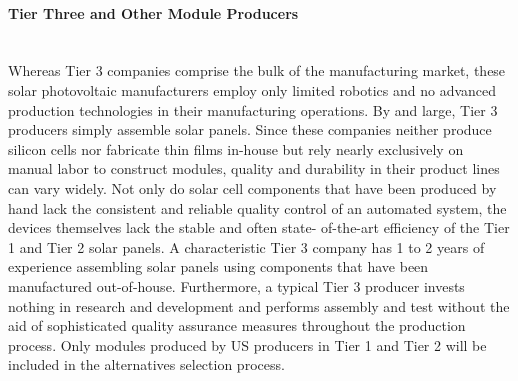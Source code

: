 \paragraph{Tier Three and Other Module Producers}\mbox{ }\\
Whereas Tier 3 companies comprise the bulk of the manufacturing market, these solar photovoltaic manufacturers employ only limited robotics and no advanced production technologies in their manufacturing operations. By and large, Tier 3 producers simply assemble solar panels. Since these companies neither produce silicon cells nor fabricate thin films in-house but rely nearly exclusively on manual labor to construct modules, quality and durability in their product lines can vary widely. Not only do solar cell components that have been produced by hand lack the consistent and reliable quality control of an automated system, the devices themselves lack the stable and often state- of-the-art efficiency of the Tier 1 and Tier 2 solar panels. A characteristic Tier 3 company has 1 to 2 years of experience assembling solar panels using components that have been manufactured out-of-house. Furthermore, a typical Tier 3 producer invests nothing in research and development and performs assembly and test without the aid of sophisticated quality assurance measures throughout the production process. Only modules produced by US producers in Tier 1 and Tier 2 will be included in the alternatives selection process.

